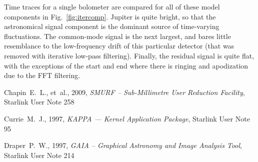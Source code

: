 \documentclass[twoside,11pt]{article}
\newcommand{\xref}[3]{#1}
\renewcommand{\_}{\texttt{\symbol{95}}}
\begin{document}
Time traces for a single bolometer are compared for all of these model
components in Fig.~\ref{fig:itercomp}. Jupiter is quite bright, so
that the astronomical signal component is the dominant source of
time-varying fluctuations. The common-mode signal is the next largest,
and bares little resemblance to the low-frequency drift of this
particular detector (that was removed with iterative low-pass
filtering). Finally, the residual signal is quite flat, with the
exceptions of the start and end where there is ringing and
apodization due to the FFT filtering.


\begin{thebibliography}{}

Chapin~E.~L., et~al., 2009, \textit{SMURF -- Sub-Millimetre User Reduction
Facility},
\xref{Starlink User Note 258}{sun258}{} 

Currie~M.~J., 1997, {\it KAPPA --- Kernel Application Package},
\xref{Starlink User Note 95}{sun95}{}

Draper~P.~W., 1997, {\it GAIA -- Graphical Astronomy and Image 
Analysis Tool},
\xref{Starlink User Note 214}{sun214}{}

\end{thebibliography}
 
\end{document}
